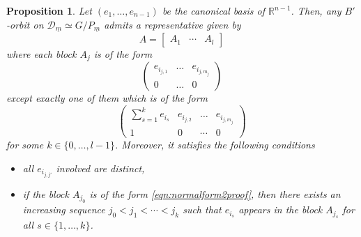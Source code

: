 \documentclass[pdftex]{sigma}
\numberwithin{equation}{section}
\newtheorem{Proposition}[Theorem]{Proposition}
\theoremstyle{definition}
\newcommand{\R}{\mathbb{R}}
\theoremstyle{plain}
\theoremstyle{plain}
\theoremstyle{plain}
\theoremstyle{plain}
\begin{document}
\begin{Proposition}{\label{theorem B proof exist}}
	Let $(e_1,\dots,e_{n-1})$ be the canonical basis of $\R^{n-1}$. Then, any $B'$-orbit on $\mathcal D_{\underline{m}} \simeq G/P_{\underline m}$ admits a representative given by
	\begin{equation*}
		A = \begin{bmatrix}
		A_1 & \cdots & A_{l}
	\end{bmatrix}
	\end{equation*}
	where each block $A_j$ is of the form
	\begin{equation}\label{eqn:normalform1proof}
		\begin{pmatrix}
			e_{i_{j,1}} & \dots & e_{i_{j,m_j}} \\
			0 & \dots & 0
		\end{pmatrix}
	\end{equation}
	except exactly one of them which is of the form
	\begin{equation}\label{eqn:normalform2proof}
		\begin{pmatrix}
			\displaystyle \sum_{s=1}^k e_{i_s} & e_{i_{j,2}} & \dots & e_{i_{j,m_j}} \\
			1 & 0 & \cdots & 0
		\end{pmatrix}
	\end{equation}
	for some $k \in \{0,\dots,l-1\}$. Moreover, it satisfies the following conditions
	\begin{itemize}[leftmargin=*, label = --]
		\item all $e_{i_{j,j'}}$ involved are distinct,
		\item if the block $A_{j_0}$ is of the form \eqref{eqn:normalform2proof}, then there exists an increasing sequence $j_0 < j_1 < \cdots < j_k$ such that $e_{i_s}$ appears in the block $A_{j_s}$ for all $s \in \{1,\dots,k\}$.
	\end{itemize}
\end{Proposition}
\end{document}
